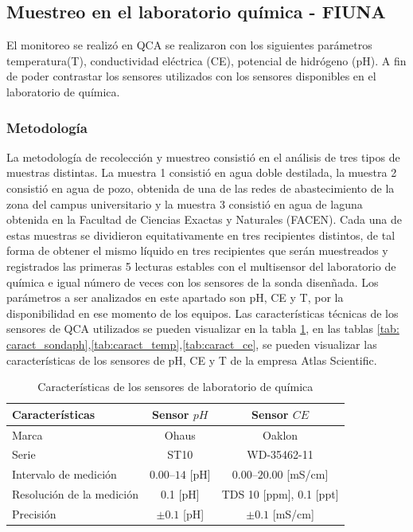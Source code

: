 \subsection{Muestreo en el laboratorio qu\'imica - FIUNA }
El monitoreo se realiz\'o en QCA se realizaron con los siguientes par\'ametros temperatura(T), conductividad el\'ectrica (CE), potencial de hidr\'ogeno (pH). A fin de poder contrastar los sensores utilizados con los sensores disponibles en el laboratorio de qu\'imica.

\subsubsection{Metodolog\'ia }
La metodolog\'ia de recolección y muestreo consisti\'o en el an\'alisis de tres tipos de muestras distintas. 
La muestra 1 consisti\'o en agua doble destilada, la muestra 2 consisti\'o en agua de pozo, obtenida de una de las redes de abastecimiento de la zona del campus universitario y la muestra 3 consisti\'o en agua de laguna obtenida en la Facultad de Ciencias Exactas y Naturales (FACEN). 
Cada una de estas muestras se dividieron equitativamente en tres recipientes distintos, de tal forma de obtener el mismo l\'iquido en tres recipientes que ser\'an muestreados y registrados las primeras 5 lecturas estables con el multisensor del laboratorio de qu\'imica e igual n\'umero de veces con los sensores de la sonda disen\~nada.
Los par\'ametros a ser analizados en este apartado son pH, CE y T, por la disponibilidad en ese momento de los equipos.
Las caracter\'isticas t\'ecnicas de los sensores de QCA utilizados se pueden visualizar en la tabla \ref{tab: Sensores laboratorio de quimica}, en las tablas \ref{tab: caract_sondaph},\ref{tab:caract_temp},\ref{tab:caract_ce}, se pueden visualizar las características de los sensores de pH, CE y T  de la empresa Atlas Scientific.
\begin{table}[H]
    \caption{Caracter\'isticas de los sensores de laboratorio de qu\'imica}
    \begin{tabular}{l c c}
        \toprule
        Caracter\'isticas & Sensor $pH$ & Sensor  $CE$ \\
        \midrule
        Marca & Ohaus       & Oaklon       \\
        Serie & ST10        & WD-35462-11  \\
        Intervalo de medici\'on                      & $0.00 – 14$ {[}pH{]} & $0.00 – 20.00$ {[}mS/cm{]}        \\
        Resoluci\'on de la medici\'on & 0.1   {[}pH{]}     & TDS 10 {[}ppm{]}, 0.1 {[}ppt{]} \\
        Precisi\'on                                  & $\pm0.1$ {[}pH{]}  & $\pm0.1$ {[}mS/cm{]} \\
        \hline
    \end{tabular}
    \label{tab: Sensores laboratorio de quimica}
 \end{table}
